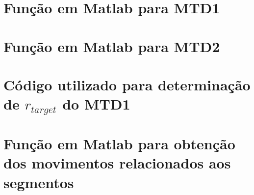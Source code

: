 	\begin{apendicesenv}
	\partapendices
\chapter{Função em Matlab para MTD1}

\chapter{Função em Matlab para MTD2}

%
%
\chapter{Código utilizado para determinação de $r_{target}$ do MTD1}
\label{ap:r_target}

\chapter{Função em Matlab para obtenção dos movimentos relacionados aos segmentos}
\label{ap:idMoves}

\end{apendicesenv}



